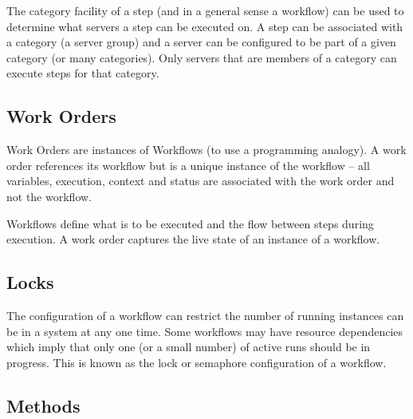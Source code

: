 The category facility of a step (and in a general sense a workflow) can be used to determine what \Rapture servers a
step can be executed on. A step can be associated with a category (a server group) and a \Rapture server can be configured
to be part of a given category (or many categories). Only servers that are members of a category can execute steps for that
category.

\subsection{Work Orders}

Work Orders are instances of Workflows (to use a programming analogy). A work order references its workflow but is a unique
instance of the workflow -- all variables, execution, context and status are associated with the work order and not the workflow.

Workflows define what is to be executed and the flow between steps during execution. A work order captures the live state of an
instance of a workflow.

\subsection{Locks}

The configuration of a workflow can restrict the number of running instances can be in a \Rapture system at any one time. Some
workflows may have resource dependencies which imply that only one (or a small number) of active runs should be in progress. This
is known as the lock or semaphore configuration of a workflow.

\subsection{Methods}

